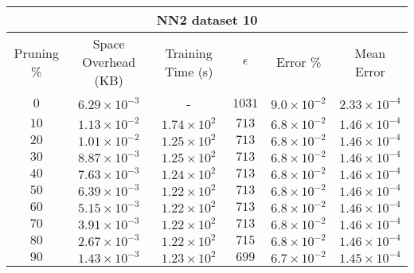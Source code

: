 \begin{adjustwidth}{0cm}{}
\begin{tabular}{cccccc}
\hline
\multicolumn{6}{c}{NN2 dataset 10} \\
\toprule
Pruning \% & Space Overhead (KB) & Training Time (s) & $\epsilon$ & Error \% & Mean Error\\
\midrule
$0$ & $6.29 \times 10^{-3}$ & - & $1031$ & $9.0 \times 10^{-2}$ & $2.33 \times 10^{-4}$\\
$10$ & $1.13 \times 10^{-2}$ & $1.74 \times 10^{2}$ & $713$ & $6.8 \times 10^{-2}$ & $1.46 \times 10^{-4}$\\
$20$ & $1.01 \times 10^{-2}$ & $1.25 \times 10^{2}$ & $713$ & $6.8 \times 10^{-2}$ & $1.46 \times 10^{-4}$\\
$30$ & $8.87 \times 10^{-3}$ & $1.25 \times 10^{2}$ & $713$ & $6.8 \times 10^{-2}$ & $1.46 \times 10^{-4}$\\
$40$ & $7.63 \times 10^{-3}$ & $1.24 \times 10^{2}$ & $713$ & $6.8 \times 10^{-2}$ & $1.46 \times 10^{-4}$\\
$50$ & $6.39 \times 10^{-3}$ & $1.22 \times 10^{2}$ & $713$ & $6.8 \times 10^{-2}$ & $1.46 \times 10^{-4}$\\
$60$ & $5.15 \times 10^{-3}$ & $1.22 \times 10^{2}$ & $713$ & $6.8 \times 10^{-2}$ & $1.46 \times 10^{-4}$\\
$70$ & $3.91 \times 10^{-3}$ & $1.22 \times 10^{2}$ & $713$ & $6.8 \times 10^{-2}$ & $1.46 \times 10^{-4}$\\
$80$ & $2.67 \times 10^{-3}$ & $1.22 \times 10^{2}$ & $715$ & $6.8 \times 10^{-2}$ & $1.46 \times 10^{-4}$\\
$90$ & $1.43 \times 10^{-3}$ & $1.23 \times 10^{2}$ & $699$ & $6.7 \times 10^{-2}$ & $1.45 \times 10^{-4}$\\
\bottomrule
\end{tabular}
\end{adjustwidth}

\null\par\null

